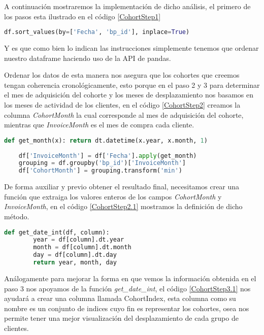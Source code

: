 	
A continuación mostraremos la implementación de dicho análisis, el primero de los pasos esta ilustrado en el código \ref{CohortStep1}

\begin{lstlisting}[language=Python, caption=código del paso 1 del analisis de cohorte, label=CohortStep1]
	df.sort_values(by=['Fecha', 'bp_id'], inplace=True)
\end{lstlisting}

Y es que como bien lo indican las instrucciones simplemente tenemos que ordenar nuestro dataframe haciendo uso de la API de pandas. 

Ordenar los datos de esta manera nos asegura que los cohortes que creemos tengan coherencia cronológicamente, esto porque en el paso 2 y 3 para determinar el mes de adquisición del cohorte y los meses de desplazamiento nos basamos en los meses de actividad de los clientes, en el código \ref{CohortStep2} creamos la columna \textit{CohortMonth} la cual corresponde al mes de adquisición del cohorte, mientras que \textit{InvoiceMonth} es el mes de compra cada cliente.

\begin{lstlisting}[language=Python, caption=código del paso 2 del analisis de cohorte, label=CohortStep2]
	def get_month(x): return dt.datetime(x.year, x.month, 1)
	
	df['InvoiceMonth'] = df['Fecha'].apply(get_month)
	grouping = df.groupby('bp_id')['InvoiceMonth']
	df['CohortMonth'] = grouping.transform('min') 
\end{lstlisting}

De forma auxiliar y previo obtener el resultado final, necesitamos crear una función que extraiga los valores enteros de los campos  \textit{CohortMonth} y \textit{InvoiceMonth}, en el código \ref{CohortStep2.1} mostramos la definición de dicho método. 

\begin{lstlisting}[language=Python, caption=código para el método get\_date\_int, label=CohortStep2.1]
	def get_date_int(df, column):
		year = df[column].dt.year
		month = df[column].dt.month
		day = df[column].dt.day
		return year, month, day
\end{lstlisting}

Análogamente para mejorar la forma en que vemos la información obtenida en el paso 3 nos apoyamos de la función \textit{get\_date\_int}, el código \ref{CohortStep3.1} nos ayudará a crear una columna llamada CohortIndex, esta columna como su nombre es un conjunto de indices cuyo fin es representar los cohortes, osea nos permite tener una mejor visualización del desplazamiento de cada grupo de clientes.


